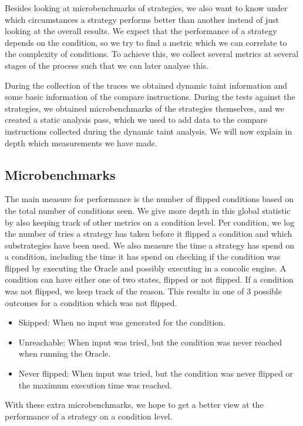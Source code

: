 Besides looking at microbenchmarks of strategies, we also want to know under which circumstances a strategy performs better than another instead of just looking at the overall results. We expect that the performance of a strategy depends on the condition, so we try to find a metric which we can correlate to the complexity of conditions. %
To achieve this, we collect several metrics at several stages of the process such that we can later analyse this. 

During the collection of the traces we obtained dynamic taint information and some basic information of the compare instructions. During the tests against the strategies, we obtained microbenchmarks of the strategies themselves, and we created a static analysis pass, which we used to add data to the compare instructions collected during the dynamic taint analysis. We will now explain in depth which measurements we have made.


\subsection{Microbenchmarks}\label{subsec:performanceMetrics}
The main measure for performance is the number of flipped conditions based on the total number of conditions seen. We give more depth in this global statistic by also keeping track of other metrics on a condition level. Per condition, we log the number of tries a strategy has taken before it flipped a condition and which substrategies have been used.
We also measure the time a strategy has spend on a condition, including the time it has spend on checking if the condition was flipped by executing the Oracle and possibly executing in a concolic engine.
A condition can have either one of two states, flipped or not flipped. If a condition was not flipped, we keep track of the reason. This results in one of 3 possible outcomes for a condition which was not flipped.
\begin{itemize}
    \item Skipped: When no input was generated for the condition.
    \item Unreachable: When input was tried, but the condition was never reached when running the Oracle.
    \item Never flipped: When input was tried, but the condition was never flipped or the maximum execution time was reached.
\end{itemize}
With these extra microbenchmarks, we hope to get a better view at the performance of a strategy on a condition level.

